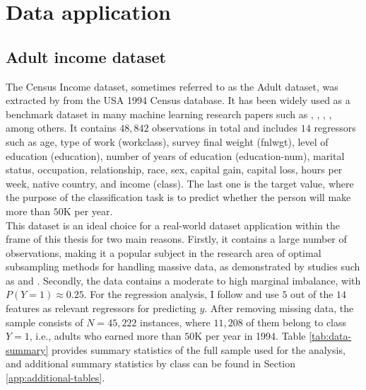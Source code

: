 \section{Data application}
\label{sec:data}
\subsection{Adult income dataset}

The Census Income dataset, sometimes referred to as the Adult dataset, was extracted by \textcite{misc_adult_2} from the USA 1994 Census database. It has been widely used as a benchmark dataset in many machine learning research papers such as \textcite{poulos2018}, \textcite{chawla2002smote}, \textcite{menardi2014}, \textcite{yao2021review}, among others. It contains $48,842$ observations in total and includes $14$ regressors such as age, type of work (workclass), survey final weight (fnlwgt), level of education (education), number of years of education (education-num), marital status, occupation, relationship, race, sex, capital gain, capital loss, hours per week, native country, and income (class). The last one is the target value, where the purpose of the classification task is to predict whether the person will make more than $50$K per year.\\

This dataset is an ideal choice for a real-world dataset application within the frame of this thesis for two main reasons. Firstly, it contains a large number of observations, making it a popular subject in the research area of optimal subsampling methods for handling massive data, as demonstrated by studies such as \textcite{wang2018optimal} and \textcite{yao2021review}. Secondly, the data contains a moderate to high marginal imbalance, with $P(Y=1) \approx 0.25$. For the regression analysis, I follow \textcite{yao2021review} and use $5$ out of the $14$ features as relevant regressors for predicting $y$. After removing missing data, the sample consists of $N=45,222$ instances, where $11,208$ of them belong to class $Y=1$, i.e., adults who earned more than $50$K per year in 1994. Table \ref{tab:data-summary} provides summary statistics of the full sample used for the analysis, and additional summary statistics by class can be found in Section \ref{app:additional-tables}.

